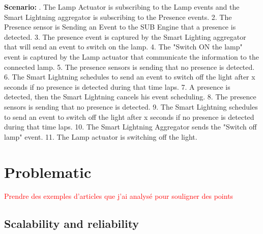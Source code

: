 \documentclass[11pt]{article}
\begin{document}
\newline
\newline
\textbf{Scenario:}
. The Lamp Actuator is subscribing to the Lamp events and the Smart Lightning aggregator is subscribing to the Presence events.
2. The Presence sensor is Sending an Event to the SUB Engine that a presence is detected. 
3. The presence event is captured by the Smart Lighting aggregator that will send an event to switch on the lamp. 
4. The "Switch ON the lamp" event is captured by the Lamp actuator that communicate the information to the connected lamp. 
5. The presence sensors is sending that no presence is detected. 
6. The Smart Lightning schedules to send an event to switch off the light after x seconds if no presence is detected during that time laps.
7. A presence is detected, then the Smart Lightning cancels his event scheduling.
8. The presence sensors is sending that no presence is detected. 
9. The Smart Lightning schedules to send an event to switch off the light after x seconds if no presence is detected during that time laps.
10. The Smart Lightning Aggregator sends the "Switch off lamp" event.
11. The Lamp actuator is switching off the light.


\section{Problematic}

\textcolor{red}{Prendre des exemples d'articles que j'ai analysé pour souligner des points}

\subsection{Scalability and reliability}
\end{document}

